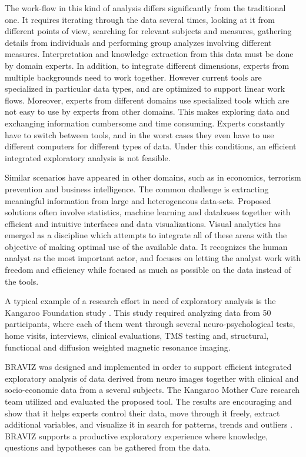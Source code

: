 \documentclass[utf8,paper]{frontiersSCNS} %
\begin{document}
The work-flow in this kind of analysis differs significantly from the traditional one. It requires iterating through the data several times, looking at it from different points of view, searching for relevant subjects and measures, gathering details from individuals and performing group analyzes involving different measures.
Interpretation and knowledge extraction from this data must be done by domain experts. In addition, to integrate different dimensions, experts from multiple backgrounds need to work together. However current tools are specialized in particular data types, and are optimized to support linear work flows. Moreover, experts from different domains use specialized tools which are not easy to use by experts from other domains.  This makes exploring data and exchanging information cumbersome and time consuming. Experts constantly have to switch between tools, and in the worst cases they even have to use different computers for different types of data. Under this conditions, an efficient integrated exploratory analysis is not feasible. 
					
Similar scenarios have appeared in other domains, such as in economics, terrorism prevention and business intelligence. The common challenge is extracting meaningful information from large and heterogeneous data-sets. Proposed solutions often involve statistics, machine learning and databases together with efficient and intuitive interfaces and data visualizations. Visual analytics \citep{keim_visual_2008} has emerged as a discipline which attempts to integrate all of these areas with the objective of making optimal use of the available data. It recognizes the human analyst as the most important actor, and focuses on letting the analyst work with freedom and efficiency while focused as much as possible on the data instead of the tools.
					
A typical example of a research effort in need of exploratory analysis is the Kangaroo Foundation study \cite{schneider_cerebral_2012}. This study required analyzing data from 50 participants, where each of them went through several neuro-psychological tests, home visits, interviews, clinical evaluations, TMS testing and, structural, functional and diffusion weighted magnetic resonance imaging. 

BRAVIZ was designed and implemented in order to support efficient integrated exploratory analysis of data derived from neuro images together with clinical and socio-economic data from a several subjects.
The Kangaroo Mother Care research team utilized and evaluated the proposed tool. The results are  encouraging and show that it helps experts control their data, move through it freely, extract additional variables, and visualize it in search for patterns, trends and outliers . BRAVIZ supports a productive exploratory experience where knowledge, questions and hypotheses can be gathered from the data.
\end{document}
